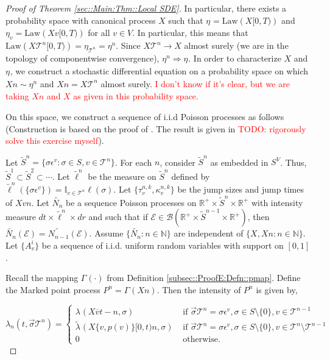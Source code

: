 \documentclass[12pt]{article}
\newcommand{\mb}{\mathbb}
\newcommand{\mc}{\mathcal}
\newcommand{\ms}{\mathscr}
\newcommand{\ra}{\rightarrow}
\newcommand{\ov}{\overline}
\newcommand{\te}{\text}
\newcommand{\ep}{\epsilon}
\newcommand{\tr}{\textcolor{red}}
\newcommand{\ind}{\hspace{24pt}}
\renewcommand{\v}{v}							%
\renewcommand{\S}{S}							%
\newcommand{\s}{\sigma}							%
\newcommand{\sv}{\vec{\s}}						%
\newcommand{\ev}[1]{\ep^{#1}}					%
\newcommand{\T}{T}								%
\renewcommand{\t}{t}							%
\newcommand{\X}{X}								%
\newcommand{\cl}{\ov}							%
\newcommand{\poiss}[1]{N_{#1}}						%
\newcommand{\law}{\te{Law}}							%
\newcommand{\pup}[1]{^{#1}}							%
\newcommand{\tree}{\mc{T}}							%
\renewcommand{\r}{r}								%
\newcommand{\rt}[1]{\tau^{#1}}						%
\renewcommand{\it}{k}								%
\newcommand{\itt}{i}								%
\newcommand{\numb}{n}								%
\newcommand{\XState}[1]{\S^{#1}}				%
\newcommand{\rp}[1]{P^{#1}}							%
\newcommand{\mmm}[3]{\eta_{#2#1}^{#3}}						%
\newcommand{\rate}[1]{\lambda_{#1}}					%
\newcommand{\crate}[2]{\alt{\lambda}_{#1}^{#2}}		%
\newcommand{\Sm}{\ell}								%
\newcommand{\alt}{\widetilde}						%
\newcommand{\rv}{A}								%
\newcommand{\evnt}{\mc{E}}						%
\renewcommand{\mark}[1]{\kappa^{#1}}				%
\newcommand{\p}[1]{p(#1)}						%
\newcommand{\pmap}[1]{\Gamma_{#1}}				%
\begin{document}
\begin{proof}[Proof of Theorem \ref{sec::Main:Thm::Local SDE}]
\ind In particular, there exists a probability space with canonical process \(\X{}{}\) such that \(\mmm{}{}{} = \law(\X{}{[0,\T)})\) and \(\mmm{\v}{}{} = \law(\X{\v}{[0,\T)})\) for all \(\v \in  V\). In particular, this means that \(\law(\X{\tree\pup{\numb}}{[0,\T)}) = \mmm{\tree\pup{\numb}}{}{} = \mmm{}{}{\numb}\). Since \(\X{\tree\pup{\numb}}{} \ra \X{}{}\) almost surely (we are in the topology of componentwise convergence), \(\mmm{}{}{\numb} \Rightarrow \mmm{}{}{}\). In order to characterize \(\X{}{}\) and \(\mmm{}{}{}\), we construct a stochastic differential equation on a probability space on which \(\X{}{}{\numb} \sim \mmm{}{}{\numb}\) and \(\X{}{}{\numb} = \X{\tree\pup{\numb}}{}\) almost surely. \tr{I don't know if it's clear, but we are taking \(\X{}{}{\numb}\) and \(\X{}{}\) as given in this probability space.}

\ind On this space, we construct a sequence of i.i.d Poisson processes as follows (Construction is based on the proof of \cite[Theorem 14.7.1(b)]{DalVer08}. The result is given in \cite[Exercise 14.7.1]{DalVer08} \tr{TODO: rigorously solve this exercise myself}).

\ind Let \(\alt{\S}^\numb = \{\s\ev{\v}: \s\in\S,\v \in \tree\pup{\numb}\}\). For each \(\numb\), consider \(\alt{\S}^\numb\) as embedded in \(\S^ V\). Thus, \(\alt{\S}^1 \subset \alt{\S}^2 \subset \cdots\). Let \(\alt{\Sm}\pup{\numb}\) be the measure on \(\alt{\S}^\numb\) defined by \(\alt{\Sm}\pup{\numb}(\{\s\ev{\v}\}) = \mb{I}_{\v \in \tree\pup{\numb}}\Sm(\s)\). Let \(\{\rt{\numb,\it}_\v,\mark{\numb,\it}_{\v}\}\) be the jump sizes and jump times of \(\X{\v}{}{\numb}\). Let \(\alt{\poiss{\numb}}\) be a sequence Poisson processes on \(\mb{R}^+\times\alt{S}^\numb\times \mb{R}^+\) with intensity measure \(d\t\times\alt{\Sm}^\numb\times d\r\) and such that if \(\evnt \in \ms{B}(\mb{R}^+\times\alt{S}^{\numb-1}\times \mb{R}^+)\), then \(\alt{\poiss{\numb}}(\evnt) = \alt{\poiss{\numb-1}}(\evnt)\). Assume \(\{\alt{\poiss{\numb}}:\numb\in\mb{N}\}\) are independent of \(\{\X{}{},\X{}{}{\numb}:\numb\in\mb{N}\}\). Let \(\{\rv_{\v}^{\itt}\}\) be a sequence of i.i.d. uniform random variables with support on \([0,1]\).

\ind Recall the mapping \(\pmap{}(\cdot)\) from Definition \ref{subsec::ProofE:Defn::pmap}. Define the Marked point process \(\rp{\numb} = \pmap{}(\X{}{}{\numb})\). Then the intensity of \(\rp{\numb}\) is given by,

\[\rate{\numb}(\t,\sv{\tree\pup{\numb}}) = \begin{cases}
\rate{}(\X{\cl{\v}}{\t-}{\numb},\s) &\te{ if } \sv{\tree\pup{\numb}} = \s\ev{\v},\s \in \S\setminus\{0\},\v\in\tree\pup{\numb-1}\\
\crate{}{}(\X{\{\v,\p{\v}\}}{[0,\t)}{\numb},\s) &\te{ if } \sv{\tree\pup{\numb}} = \s\ev{\v},\s\in\S\setminus\{0\},\v\in\tree\pup{\numb}\setminus\tree\pup{\numb-1}\\
0 &\te{ otherwise.}
\end{cases}\]


\end{proof}
\end{document}
